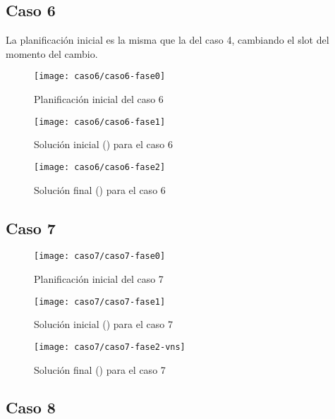 \FloatBarrier
\newpage
\subsection{Caso 6}

La planificación inicial es la misma que la del caso 4, cambiando el slot del momento del cambio.

\begin{figure}[!h]
	\centering
	\texttt{[image: caso6/caso6-fase0]}
	\caption{Planificación inicial del caso 6}
	\label{fig:caso6-fase0}
\end{figure}

\begin{figure}[!h]
	\centering
	\texttt{[image: caso6/caso6-fase1]}
	\caption{Solución inicial (\faseuno{}) para el caso 6}
	\label{fig:caso6-fase1}
\end{figure}

\begin{figure}[!h]
	\centering
	\texttt{[image: caso6/caso6-fase2]}
	\caption{Solución final (\fasedos{}) para el caso 6}
	\label{fig:caso6-fase2}
\end{figure}

\FloatBarrier
\newpage
\subsection{Caso 7}

\begin{figure}[!h]
	\centering
	\texttt{[image: caso7/caso7-fase0]}
	\caption{Planificación inicial del caso 7}
	\label{fig:caso7-fase0}
\end{figure}

\begin{figure}[!h]
	\centering
	\texttt{[image: caso7/caso7-fase1]}
	\caption{Solución inicial (\faseuno{}) para el caso 7}
	\label{fig:caso7-fase1}
\end{figure}

\begin{figure}[!h]
	\centering
	\texttt{[image: caso7/caso7-fase2-vns]}
	\caption{Solución final (\fasedos{}) para el caso 7}
	\label{fig:caso7-fase2}
\end{figure}

\FloatBarrier
\newpage
\subsection{Caso 8}

